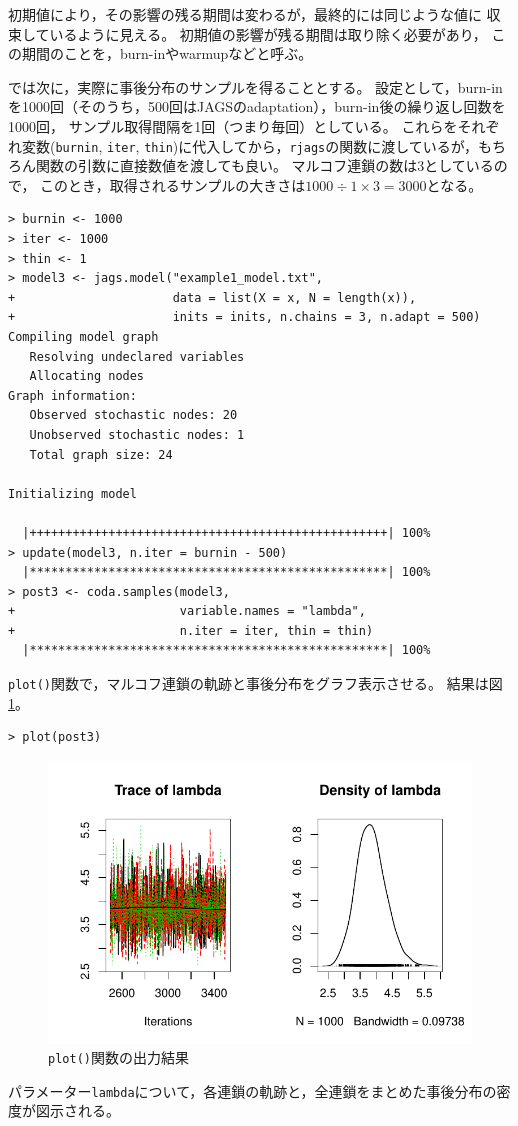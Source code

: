 \documentclass[11pt,uplatex]{jsarticle}
\begin{document}
初期値により，その影響の残る期間は変わるが，最終的には同じような値に
収束しているように見える。
初期値の影響が残る期間は取り除く必要があり，
この期間のことを，burn-inやwarmupなどと呼ぶ。

では次に，実際に事後分布のサンプルを得ることとする。
設定として，burn-inを1000回（そのうち，500回は\textsf{JAGS}のadaptation），burn-in後の繰り返し回数を1000回，
サンプル取得間隔を1回（つまり毎回）としている。
これらをそれぞれ変数(\texttt{burnin}, \texttt{iter}, \texttt{thin})に代入してから，\texttt{rjags}の関数に渡しているが，もちろん関数の引数に直接数値を渡しても良い。
マルコフ連鎖の数は3としているので，
このとき，取得されるサンプルの大きさは$1000 \div 1 \times 3 = 3000$となる。

\begin{lstlisting}
> burnin <- 1000
> iter <- 1000
> thin <- 1
> model3 <- jags.model("example1_model.txt",
+                      data = list(X = x, N = length(x)),
+                      inits = inits, n.chains = 3, n.adapt = 500)
Compiling model graph
   Resolving undeclared variables
   Allocating nodes
Graph information:
   Observed stochastic nodes: 20
   Unobserved stochastic nodes: 1
   Total graph size: 24

Initializing model

  |++++++++++++++++++++++++++++++++++++++++++++++++++| 100%
> update(model3, n.iter = burnin - 500)
  |**************************************************| 100%
> post3 <- coda.samples(model3,
+                       variable.names = "lambda",
+                       n.iter = iter, thin = thin)
  |**************************************************| 100%
\end{lstlisting}

\texttt{plot()}関数で，マルコフ連鎖の軌跡と事後分布をグラフ表示させる。
結果は図\ref{fig:plot}。
\begin{lstlisting}
> plot(post3)
\end{lstlisting}

\begin{figure}[hbtp]
  \begin{center}
    \includegraphics[bb=0 0 360 240, clip, width=260 bp]{example1-3.pdf}
  \end{center}
  \caption{\texttt{plot()}関数の出力結果}
  \label{fig:plot}
\end{figure}\noindent
パラメーター\texttt{lambda}について，各連鎖の軌跡と，全連鎖をまとめた事後分布の密度が図示される。
\end{document}
